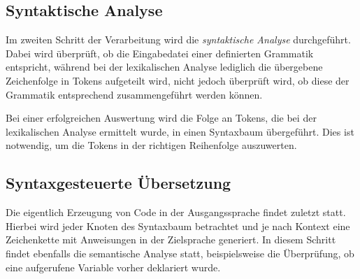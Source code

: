 \subsection{Syntaktische Analyse}
Im zweiten Schritt der Verarbeitung wird die \textit{syntaktische Analyse} durchgeführt. Dabei wird überprüft, ob die Eingabedatei einer definierten Grammatik entspricht, während bei der lexikalischen Analyse lediglich die übergebene Zeichenfolge in Tokens aufgeteilt wird, nicht jedoch überprüft wird, ob diese der Grammatik entsprechend zusammengeführt werden können. 

Bei einer erfolgreichen Auswertung wird die Folge an Tokens, die bei der lexikalischen Analyse ermittelt wurde, in einen Syntaxbaum übergeführt. Dies ist notwendig, um die Tokens in der richtigen Reihenfolge auszuwerten. 

\subsection{Syntaxgesteuerte Übersetzung}
Die eigentlich Erzeugung von Code in der Ausgangssprache findet zuletzt statt. Hierbei wird jeder Knoten des Syntaxbaum betrachtet und je nach Kontext eine Zeichenkette mit Anweisungen in der Zielsprache generiert. In diesem Schritt findet ebenfalls die semantische Analyse statt, beispielsweise die Überprüfung, ob eine aufgerufene Variable vorher deklariert wurde.
